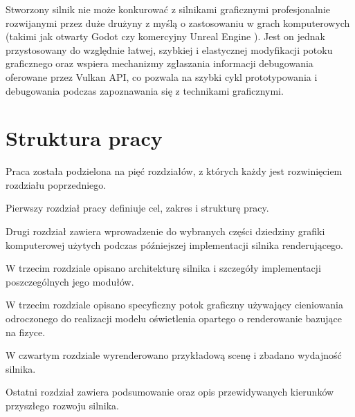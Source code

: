 Stworzony silnik nie może konkurować z silnikami graficznymi profesjonalnie rozwijanymi przez duże drużyny z myślą o zastosowaniu w grach komputerowych (takimi jak otwarty Godot \cite{godotengine} czy komercyjny Unreal Engine \cite{unrealengine}).
Jest on jednak przystosowany do względnie łatwej, szybkiej i elastycznej modyfikacji potoku graficznego oraz wspiera mechanizmy zgłaszania informacji debugowania oferowane przez Vulkan API, co pozwala na szybki cykl prototypowania i debugowania podczas zapoznawania się z technikami graficznymi.

\section{Struktura pracy}


Praca została podzielona na pięć rozdziałów, z których każdy jest rozwinięciem rozdziału poprzedniego.

Pierwszy rozdział pracy definiuje cel, zakres i strukturę pracy.

Drugi rozdział zawiera wprowadzenie do wybranych części dziedziny grafiki komputerowej użytych podczas późniejszej implementacji silnika renderującego.

W trzecim rozdziale opisano architekturę silnika i szczegóły implementacji poszczególnych jego modułów.

W trzecim rozdziale opisano specyficzny potok graficzny używający cieniowania odroczonego do realizacji modelu oświetlenia
opartego o renderowanie bazujące na fizyce.

W czwartym rozdziale wyrenderowano przykładową scenę i zbadano wydajność
silnika.

Ostatni rozdział zawiera podsumowanie oraz opis przewidywanych kierunków przyszłego rozwoju silnika.




